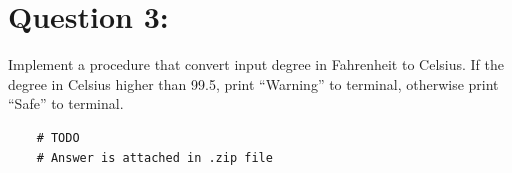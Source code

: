 \documentclass[12pt,a4paper]{article}
\begin{document}
\section*{Question 3:}
Implement a procedure that convert input degree in Fahrenheit to Celsius.
If the degree in Celsius higher than 99.5, print ``Warning'' to terminal, otherwise print ``Safe'' to terminal.

\begin{mdframed}[hidealllines=true,backgroundcolor=magenta!10]
  \begin{lstlisting}
    # TODO
    # Answer is attached in .zip file
  \end{lstlisting}
\end{mdframed}
\end{document}
